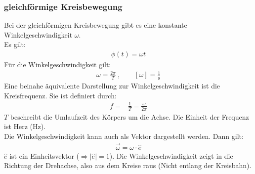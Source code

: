 \documentclass{article}
\begin{document}
\subsubsection{gleichförmige Kreisbewegung}
Bei der gleichförmigen Kreisbewegung gibt es eine konstante Winkelgeschwindigkeit $\omega$.\\ Es gilt:
\begin{align}
    \phi(t)=\omega t
\end{align}
Für die Winkelgeschwindigkeit gilt:
\begin{align}
    \omega=\frac{2\pi}{T} \ ,\qquad [\omega]=\frac{1}{\mathrm{s}}
\end{align}
Eine beinahe äquivalente Darstellung zur Winkelgeschwindigkeit ist die Kreisfrequenz. 
Sie ist definiert durch:
\begin{align}
    f=&\frac{1}{T}=\frac{\omega}{2\pi}
\end{align}
$T$ beschreibt die Umlaufzeit des Körpers um die Achse. Die Einheit der Frequenz ist Herz ($\mathrm{Hz}$).\\

\noindent Die Winkelgeschwindigkeit kann auch als Vektor dargestellt werden. Dann gilt:
\begin{align}
    \vec{\omega}=\omega\cdot \hat{e}
\end{align}
$\hat{e}$ ist ein Einheitsvektor ($\Rightarrow |\hat{e}|=1$). Die Winkelgeschwindigkeit zeigt in die Richtung der Drehachse, also aus dem Kreise raus
(Nicht entlang der Kreisbahn).\\
\end{document}
